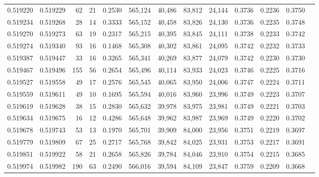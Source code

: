 \begin{tabular}{rrrrrrrrrrrrr}
0.519220 & 0.519229 &    62 &    21 &                                     0.2530 & 565,124 &  40,486 &  83,812 &  24,144 & 0.3736 & 0.2236 & 0.3750 \\
0.519234 & 0.519268 &    28 &    14 &                                     0.3333 & 565,152 &  40,458 &  83,826 &  24,130 & 0.3736 & 0.2235 & 0.3748 \\
0.519270 & 0.519273 &    63 &    19 &                                     0.2317 & 565,215 &  40,395 &  83,845 &  24,111 & 0.3738 & 0.2233 & 0.3742 \\
0.519274 & 0.519340 &    93 &    16 &                                     0.1468 & 565,308 &  40,302 &  83,861 &  24,095 & 0.3742 & 0.2232 & 0.3733 \\
0.519387 & 0.519447 &    33 &    16 &                                     0.3265 & 565,341 &  40,269 &  83,877 &  24,079 & 0.3742 & 0.2230 & 0.3730 \\
0.519467 & 0.519496 &   155 &    56 &                                     0.2654 & 565,496 &  40,114 &  83,933 &  24,023 & 0.3746 & 0.2225 & 0.3716 \\
0.519527 & 0.519558 &    49 &    17 &                                     0.2576 & 565,545 &  40,065 &  83,950 &  24,006 & 0.3747 & 0.2224 & 0.3711 \\
0.519559 & 0.519611 &    49 &    10 &                                     0.1695 & 565,594 &  40,016 &  83,960 &  23,996 & 0.3749 & 0.2223 & 0.3707 \\
0.519619 & 0.519628 &    38 &    15 &                                     0.2830 & 565,632 &  39,978 &  83,975 &  23,981 & 0.3749 & 0.2221 & 0.3703 \\
0.519634 & 0.519675 &    16 &    12 &                                     0.4286 & 565,648 &  39,962 &  83,987 &  23,969 & 0.3749 & 0.2220 & 0.3702 \\
0.519678 & 0.519743 &    53 &    13 &                                     0.1970 & 565,701 &  39,909 &  84,000 &  23,956 & 0.3751 & 0.2219 & 0.3697 \\
0.519779 & 0.519809 &    67 &    25 &                                     0.2717 & 565,768 &  39,842 &  84,025 &  23,931 & 0.3753 & 0.2217 & 0.3691 \\
0.519851 & 0.519922 &    58 &    21 &                                     0.2658 & 565,826 &  39,784 &  84,046 &  23,910 & 0.3754 & 0.2215 & 0.3685 \\
0.519974 & 0.519982 &   190 &    63 &                                     0.2490 & 566,016 &  39,594 &  84,109 &  23,847 & 0.3759 & 0.2209 & 0.3668 \\

\end{tabular}
